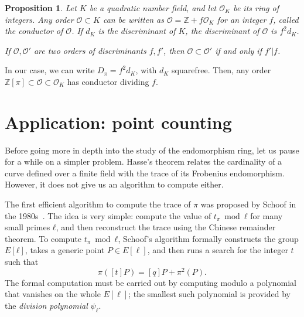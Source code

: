 \documentclass[10pt]{article}
\theoremstyle{plain}
\newtheorem{proposition}[theorem]{Proposition}
\theoremstyle{definition}
\def\O{\ensuremath{\mathcal{O}}}
\begin{document}
\begin{proposition}
  Let $K$ be a quadratic number field, and let $\O_K$ be its ring of
  integers. %
  Any order $\O⊂K$ can be written as $\O=ℤ+f\O_K$ for an integer $f$,
  called the \emph{conductor} of $\O$. %
  If $d_K$ is the \emph{discriminant} of $K$, the discriminant of $\O$
  is $f^2d_K$.

  If $\O,\O'$ are two orders of discriminants $f,f'$, then $\O⊂\O'$ if
  and only if $f'|f$.
\end{proposition}

In our case, we can write $D_π=f^2d_K$, with $d_K$
squarefree. %
Then, any order $ℤ[π] ⊂ \O ⊂ \O_K$ has conductor dividing $f$.

\section{Application: point counting}
\label{sec:appl-point-count}

Before going more in depth into the study of the endomorphism ring,
let us pause for a while on a simpler problem. %
Hasse's theorem relates the cardinality of a curve defined over a
finite field with the trace of its Frobenius endomorphism. %
However, it does not give us an algorithm to compute either.

The first efficient algorithm to compute the trace of $π$ was proposed
by Schoof in the 1980s~\cite{schoof85}. %
The idea is very simple: compute the value of $t_π\bmod ℓ$ for many
small primes $ℓ$, and then reconstruct the trace using the Chinese
remainder theorem. %
To compute $t_π\bmod ℓ$, Schoof's algorithm formally constructs the
group $E[ℓ]$, takes a generic point $P∈E[\ell]$, and then runs a
search for the integer $t$ such that
\[π([t]P) = [q]P + π^2(P).\] %
The formal computation must be carried out by computing modulo a
polynomial that vanishes on the whole $E[\ell]$; the smallest such
polynomial is provided by the \emph{division polynomial} $ψ_ℓ$.
\end{document}
